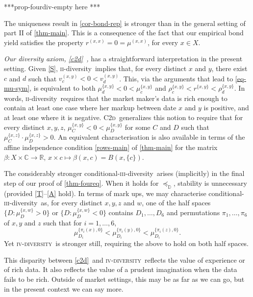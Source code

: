 \documentclass[ecta,nameyear,draft]{econsocart}
\newcommand{\R}{\mathbb R}
\newcommand{\mbbd}{{\mathds D}}
\newcommand{\mbbc}{{\mathds C}}
\newcommand{\xx}{(x,x)}
\newcommand{\xy}{{(x, y)}}
\newcommand{\stability}{\ref{S}}
\newcommand{\Condtwodiv}{\textsc{C2d}}
\newcommand{\condthreediv}{\textup{conditional-\textsc{iii}-diversity}}
\newcommand{\twodiv}{\textsc{ii}-\textup{diversity}}
\newcommand{\fourdiv}{\textsc{iv}-\textsc{diversity}}
\theoremstyle{plain}
\theoremstyle{remark}
\begin{document}
***prop-fourdiv-empty here ***

The uniqueness result in \cref{cor-bond-rep} is stronger than in the general
setting of part II of \cref{thm-main}. This is a consequence of the fact that
our empirical bond yield satisfies the property $r^{\xx} = 0 = \mu^{\xx}$, for
every $x \in X$. 

\emph{Our diversity axiom, \ref{c2d}\ ,} has a straightforward
interpretation in the present setting. Given \stability, \twodiv\ implies that,
for every distinct $x$ and $y$, there exist $c$ and $d$ such that $v^{\xy}_{c}
< 0 < v^{\xy}_{d}$.  This, via the arguments that lead to \cref{eq-mu-sym}, is
equivalent to both $\mu^{\{x,y\}}_{d} < 0 < \mu^{\{x,y\}}_{c}$ and
$\rho^{\{x,y\}}_{c} < r^{\{x,y\}} < \rho^{\{x,y\}}_{d}$.  In words, \twodiv\
requires that the market maker's data is rich enough to contain at least one
case where her markup between date $x$ and $y$ is positive, and at least one
where it is negative.
\Condtwodiv\ {generalizes} this notion to require that for every distinct $x,
y, z$, $\mu^{\{x,y\}}_{C} < 0 < \mu^{\{x,y\}}_{D}$ for some $C$ and $D$ such
that $\mu^{\{x,z\}}_{C}\cdot \mu^{\{x,z\}}_{D} >0$. An equivalent
characterisation is also available in terms of the affine independence
condition \ref{rows-main} of \cref{thm-main} for the matrix $\beta: X \times
\mbbc \rightarrow \R$, $x\times c \mapsto \beta(x, c) = B(x, \{c\})$.

The considerably stronger \condthreediv\ arises (implicitly) in
the final step of our proof of \cref{thm-foureq}. When it holds for
$\preceq_{\mbbd}$, {stability} is unnecessary (provided \ref{T}--\ref{A} hold).
In terms of mark ups, we may characterise \condthreediv\ as,
for every distinct $x, y, z$ and $w$, one of the half spaces $\{D :
\mu^{\{x,w\}}_D > 0\}$ or $\{D: \mu^{\{x,w\}}_D < 0\}$ contains $D_1, \dots,
D_6$ and permutations $\pi_1, \dots, \pi_6$ of $x, y$ and $z$ such that for
$i=1,\dots,6$, 
\begin{equation*}
  \mu^{\{\pi_i(x),0\}}_{D_i} < \mu^{\{\pi_i(y),0\}}_{D_i} <
  \mu^{\{\pi_i(z),0\}}_{D_i}.
\end{equation*}
Yet \fourdiv\ is stronger still, requiring the above to hold on both half
spaces.

This disparity between \ref{c2d}\ and \fourdiv\ reflects the value of
experience or of rich data. It also reflects the value of a prudent imagination
when the data fails to be rich.  Outside of market settings, this may be as far
as we can go, but in the present context we can say more.
\end{document}
